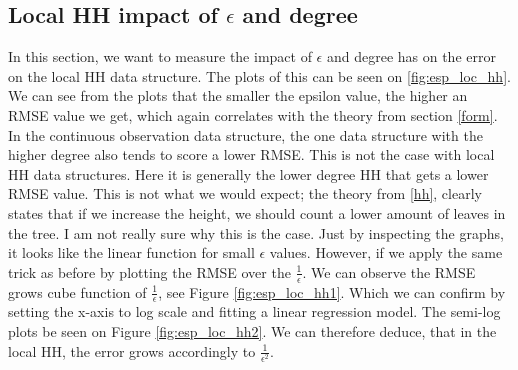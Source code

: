 \documentclass[11pt]{article}
\theoremstyle{definition}
\begin{document}
\subsection{Local HH impact of $\epsilon$ and degree}
In this section, we want to measure the impact of $\epsilon$ and degree has on the error on the local HH data structure. The plots of this can be seen on \ref{fig:esp_loc_hh}. We can see from the plots that the smaller the epsilon value, the higher an RMSE value we get, which again correlates with the theory from section \ref{form}. In the continuous observation data structure, the one data structure with the higher degree also tends to score a lower RMSE. This is not the case with local HH data structures. Here it is generally the lower degree HH that gets a lower RMSE value. This is not what we would expect; the theory from \ref{hh}, clearly states that if we increase the height, we should count a lower amount of leaves in the tree. I am not really sure why this is the case. Just by inspecting the graphs, it looks like the linear function for small $\epsilon$ values. However, if we apply the same trick as before by plotting the RMSE over the $\frac{1}{\epsilon}$. We can observe the RMSE grows cube function of $\frac{1}{\epsilon}$, see Figure \ref{fig:esp_loc_hh1}. Which we can confirm by setting the x-axis to log scale and fitting a linear regression model. The semi-log plots be seen on Figure \ref{fig:esp_loc_hh2}.  We can therefore deduce, that in the local HH, the error grows accordingly to $\frac{1}{\epsilon^2}$.
\end{document}
